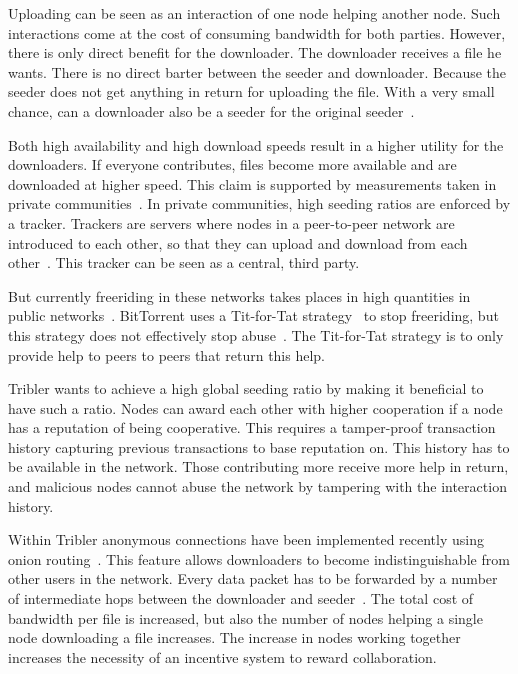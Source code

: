 Uploading can be seen as an interaction of one node helping another node.
Such interactions come at the cost of consuming bandwidth for both parties.
However, there is only direct benefit for the downloader.
The downloader receives a file he wants.
There is no direct barter between the seeder and downloader.
Because the seeder does not get anything in return for uploading the file.
With a very small chance, can a downloader also be a seeder for the original seeder~\cite{Lai-Incentives}.

Both high availability and high download speeds result in a higher utility for the downloaders.
If everyone contributes, files become more available and are downloaded at higher speed.
This claim is supported by measurements taken in private communities~\cite{meulpolder-privatecommunities}.
In private communities, high seeding ratios are enforced by a tracker.
Trackers are servers where nodes in a peer-to-peer network are introduced to each other,
so that they can upload and download from each other~\cite{cohen-titfortat}.
This tracker can be seen as a central, third party.

But currently freeriding in these networks takes places in high quantities in public networks~\cite{Adar-Freeriding}.
BitTorrent uses a Tit-for-Tat strategy~\cite{cohen-titfortat} to stop freeriding,
but this strategy does not effectively stop abuse~\cite{Pouwelse-tribler}.
The Tit-for-Tat strategy is to only provide help to peers to peers that return this help.

Tribler wants to achieve a high global seeding ratio by making it beneficial to have such a ratio.
Nodes can award each other with higher cooperation if a node has a reputation of being cooperative.
This requires a tamper-proof transaction history capturing previous transactions to base reputation on.
This history has to be available in the network.
Those contributing more receive more help in return,
and malicious nodes cannot abuse the network by tampering with the interaction history.

Within Tribler anonymous connections have been implemented recently using onion routing~\cite{Plak-anonymous,ruigrok-anonymous,tanaskoski-anonymous}.
This feature allows downloaders to become indistinguishable from other users in the network.
Every data packet has to be forwarded
by a number of intermediate hops between the downloader and seeder~\cite{Plak-anonymous,tanaskoski-anonymous}.
The total cost of bandwidth per file is increased,
but also the number of nodes helping a single node downloading a file increases.
The increase in nodes working together increases the necessity of an incentive system to reward collaboration.

